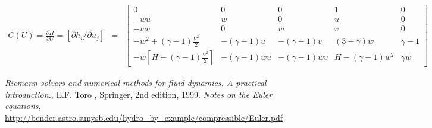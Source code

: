 \documentclass{article}
\begin{document}
\begin{eqnarray}
  C(U) = \frac{\partial H}{\partial U} = \left[ \partial h_i/\partial u_j \right] & = & \left[
    \begin{array}{ccccc}
      0 & 0 & 0 & 1 & 0\\
      -w u & w & 0 & u & 0\\
      -w v & 0 & w & v & 0\\
      -w^2+(\gamma-1)\frac{V^2}{2} & -(\gamma-1)u & -(\gamma-1)v & (3-\gamma) w &  \gamma-1\\
      -w [H - (\gamma-1)\frac{V^2}{2}] & -(\gamma-1)wu & -(\gamma-1)wv & H-(\gamma-1)w^2 & \gamma w
    \end{array}
  \right]
\end{eqnarray}


\begin{thebibliography}{9}
 \emph{Riemann solvers and numerical methods for fluid dynamics. A practical introduction.}, E.F. Toro , Springer, 2nd edition, 1999.
 \emph{Notes on the Euler equations}, \url{http://bender.astro.sunysb.edu/hydro_by_example/compressible/Euler.pdf}
\end{thebibliography}
\end{document}
